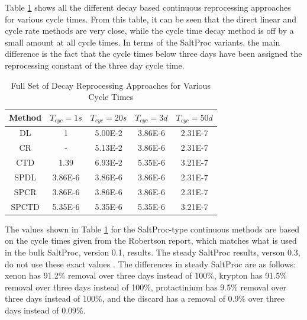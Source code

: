 Table \ref{tab:repr_decay_view_full} shows all the different decay based continuous reprocessing approaches for various cycle times. From this table, it can be seen that the direct linear and cycle rate methods are very close, while the cycle time decay method is off by a small amount at all cycle times. In terms of the SaltProc variants, the main difference is the fact that the cycle times below three days have been assigned the reprocessing constant of the three day cycle time.

\begin{table}[H]
\renewcommand{\arraystretch}{1.25}
\caption{Full Set of Decay Reprocessing Approaches for Various Cycle Times}
\label{tab:repr_decay_view_full}
\begin{center}
\begin{tabular}{ | c | c | c | c | c | }
 \hline
 Method & $T_{cyc} = 1 s$ & $T_{cyc} = 20 s$ & $T_{cyc} = 3 d$ & $T_{cyc} = 50 d$\\
 \hline
 \hline
 DL & 1 & 5.00E-2 & 3.86E-6 & 2.31E-7\\
 CR & - & 5.13E-2 & 3.86E-6 & 2.31E-7\\
 CTD & 1.39 & 6.93E-2 & 5.35E-6 & 3.21E-7\\
 \hline
 SPDL & 3.86E-6 & 3.86E-6 & 3.86E-6 & 2.31E-7\\
 SPCR & 3.86E-6 & 3.86E-6 & 3.86E-6 & 2.31E-7\\
 SPCTD & 5.35E-6 & 5.35E-6 & 5.35E-6 & 3.21E-7\\
 \hline
\end{tabular}
\end{center}
\end{table}

The values shown in Table \ref{tab:repr_decay_view_full} for the SaltProc-type continuous methods are based on the cycle times given from the Robertson report, which matches what is used in the bulk SaltProc, version 0.1, results. The steady SaltProc results, verson 0.3, do not use these exact values \cite{robertson_conceptual_1971, rykhlevskii_advanced_2018}. The differences in steady SaltProc are as follows: xenon has 91.2\% removal over three days instead of 100\%, krypton has 91.5\% removal over three days instead of 100\%, protactinium has 9.5\% removal over three days instead of 100\%, and the discard has a removal of 0.9\% over three days instead of 0.09\%. %


